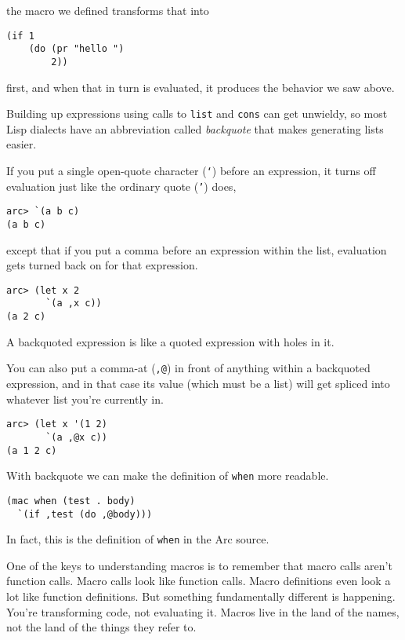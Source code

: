 \documentclass[a4paper,12pt]{book}
\begin{document}
the macro we defined transforms that into 

\begin{verbatim}
(if 1 
    (do (pr "hello ") 
        2))
\end{verbatim}

first, and when that in turn is evaluated, it produces the behavior
we saw above.

Building up expressions using calls to \verb|list| and \verb|cons| can get unwieldy,
so most {\sc{}Lisp} dialects have an abbreviation called {\em{}backquote} that
makes generating lists easier.

If you put a single open-quote character ({\tt`}) before an expression,
it turns off evaluation just like the ordinary quote ({\tt'}) does,

\begin{verbatim}
arc> `(a b c)
(a b c)
\end{verbatim}

except that if you put a comma before an expression within the list,
evaluation gets turned back on for that expression.

\begin{verbatim}
arc> (let x 2
       `(a ,x c))
(a 2 c)
\end{verbatim}

A backquoted expression is like a quoted expression with holes in it.

You can also put a comma-at ({\tt,@}) in front of anything within a
backquoted expression, and in that case its value (which must be a
list) will get spliced into whatever list you're currently in.

\begin{verbatim}
arc> (let x '(1 2)
       `(a ,@x c))
(a 1 2 c)
\end{verbatim}

With backquote we can make the definition of \verb|when| more readable.

\begin{verbatim}
(mac when (test . body)
  `(if ,test (do ,@body)))
\end{verbatim}

In fact, this is the definition of \verb|when| in the {\sc{}Arc} source.

One of the keys to understanding macros is to remember that macro
calls aren't function calls.  Macro calls look like function calls.
Macro definitions even look a lot like function definitions.  But
something fundamentally different is happening.  You're transforming
code, not evaluating it.  Macros live in the land of the names, not 
the land of the things they refer to.
\end{document}
